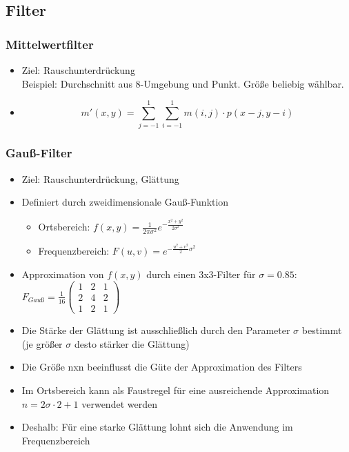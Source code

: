 \subsection{Filter}

\subsubsection{Mittelwertfilter}
\begin{itemize}
	\item Ziel: Rauschunterdrückung \\ Beispiel: Durchschnitt aus 8-Umgebung und Punkt. Größe beliebig wählbar.
  \item $$m'(x,y) = \sum\limits_{j=-1}^1 \sum\limits_{i=-1}^1 m(i,j) \cdot p(x-j,y-i)$$
\end{itemize}

\subsubsection{Gauß-Filter}
\begin{itemize}
  \item Ziel: Rauschunterdrückung, Glättung
  \item Definiert durch zweidimensionale Gauß-Funktion
	
	\begin{itemize}
		\item Ortsbereich: $f(x,y) = \frac{1}{2 \pi \sigma^2} e^{-\frac{x^2 + y^2}{2\sigma^2}}$
		\item Frequenzbereich: $F(u,v)=e^{-\frac{u^2 + v^2}{2}\sigma^2}$
	\end{itemize}
	
	\item Approximation von $f(x,y)$ durch einen 3x3-Filter für $\sigma=0.85$: $F_{Gauß}=\frac{1}{16} \left(
	\begin{array}{ccc}
	1 & 2 & 1 \\
	2 & 4 & 2 \\
	1 & 2 & 1
	\end{array} \right)
	$
	
	\item Die Stärke der Glättung ist ausschließlich durch den Parameter $\sigma$ bestimmt (je größer $\sigma$ desto stärker die Glättung)
	\item Die Größe nxn beeinflusst die Güte der Approximation des Filters
	\item Im Ortsbereich kann als Faustregel für eine ausreichende Approximation $n=2\sigma \cdot 2 +1 $ verwendet werden
	\item Deshalb: Für eine starke Glättung lohnt sich die Anwendung im Frequenzbereich
\end{itemize}



